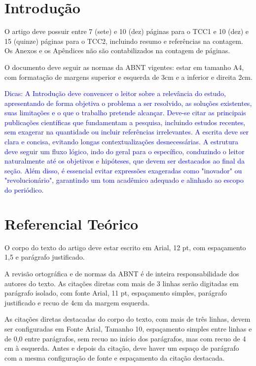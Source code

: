 \documentclass[
	article,			%
	11pt,				%
	oneside,			%
	a4paper,			%
	english,			%
	brazil,				%
	sumario=tradicional
]{abntex2}
\begin{document}
\section{Introdução}

O artigo deve possuir entre 7 (sete) e 10 (dez) páginas para o TCC1 e 10
(dez) e 15 (quinze) páginas para o TCC2, incluindo resumo e referências na
contagem. Os Anexos e os Apêndices não são contabilizados na contagem de
páginas.

O documento deve seguir as normas da ABNT vigentes: estar em tamanho A4, com
formatação de margens superior e esquerda de 3cm e a inferior e direita 2cm.

\textcolor{blue}{
Dicas: A Introdução deve convencer o leitor sobre a relevância do estudo,
apresentando de forma objetiva o problema a ser resolvido, as soluções
existentes, suas limitações e o que o trabalho pretende alcançar. Deve-se citar
as principais publicações científicas que fundamentam a pesquisa, incluindo
estudos recentes, sem exagerar na quantidade ou incluir referências
irrelevantes. A escrita deve ser clara e concisa, evitando longas
contextualizações desnecessárias. A estrutura deve seguir um fluxo lógico, indo
do geral para o específico, conduzindo o leitor naturalmente até os objetivos e
hipóteses, que devem ser destacados ao final da seção. Além disso, é essencial
evitar expressões exageradas como "inovador" ou "revolucionário", garantindo um
tom acadêmico adequado e alinhado ao escopo do periódico.
}

\section{Referencial Teórico}

O corpo do texto do artigo deve estar escrito em Arial, 12 pt, com espaçamento
1,5 e parágrafo justificado.

A revisão ortográfica e de normas da ABNT é de inteira responsabilidade dos
autores do texto. As citações diretas com mais de 3 linhas serão digitadas em
parágrafo isolado, com fonte Arial, 11 pt, espaçamento simples, parágrafo
justificado e recuo de 4cm da margem esquerda.

\begin{flushright}
    \begin{minipage}{0.8\textwidth}
\fontsize{10}{12}\selectfont
As citações diretas destacadas do corpo do texto, com mais de três linhas,
devem ser configuradas em Fonte Arial, Tamanho 10, espaçamento simples entre
linhas e de 0,0 entre parágrafos, sem recuo no início dos parágrafos, mas com
recuo de 4 cm à esquerda. Antes e depois da citação, deve haver um espaço de
parágrafo com a mesma configuração de fonte e espaçamento da citação destacada.
    \end{minipage}
\end{flushright}
\end{document}
